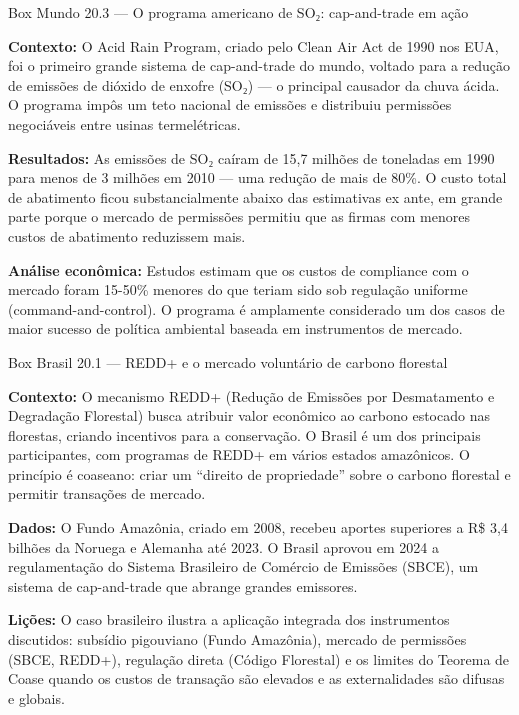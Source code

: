 \documentclass[11pt,twoside,openright]{book}
\begin{document}
\begin{boxmundobox}{Box Mundo 20.3 — O programa americano de SO₂: cap-and-trade em ação}

\textbf{Contexto:} O Acid Rain Program, criado pelo Clean Air Act de
1990 nos EUA, foi o primeiro grande sistema de cap-and-trade do mundo,
voltado para a redução de emissões de dióxido de enxofre (SO₂) --- o
principal causador da chuva ácida. O programa impôs um teto nacional de
emissões e distribuiu permissões negociáveis entre usinas termelétricas.

\textbf{Resultados:} As emissões de SO₂ caíram de 15,7 milhões de
toneladas em 1990 para menos de 3 milhões em 2010 --- uma redução de
mais de 80\%. O custo total de abatimento ficou substancialmente abaixo
das estimativas ex ante, em grande parte porque o mercado de permissões
permitiu que as firmas com menores custos de abatimento reduzissem mais.

\textbf{Análise econômica:} Estudos estimam que os custos de compliance
com o mercado foram 15-50\% menores do que teriam sido sob regulação
uniforme (command-and-control). O programa é amplamente considerado um
dos casos de maior sucesso de política ambiental baseada em instrumentos
de mercado.

\end{boxmundobox}

\begin{boxbrasilbox}{Box Brasil 20.1 — REDD+ e o mercado voluntário de carbono florestal}

\textbf{Contexto:} O mecanismo REDD+ (Redução de Emissões por
Desmatamento e Degradação Florestal) busca atribuir valor econômico ao
carbono estocado nas florestas, criando incentivos para a conservação. O
Brasil é um dos principais participantes, com programas de REDD+ em
vários estados amazônicos. O princípio é coaseano: criar um ``direito de
propriedade'' sobre o carbono florestal e permitir transações de
mercado.

\textbf{Dados:} O Fundo Amazônia, criado em 2008, recebeu aportes
superiores a R\$ 3,4 bilhões da Noruega e Alemanha até 2023. O Brasil
aprovou em 2024 a regulamentação do Sistema Brasileiro de Comércio de
Emissões (SBCE), um sistema de cap-and-trade que abrange grandes
emissores.

\textbf{Lições:} O caso brasileiro ilustra a aplicação integrada dos
instrumentos discutidos: subsídio pigouviano (Fundo Amazônia), mercado
de permissões (SBCE, REDD+), regulação direta (Código Florestal) e os
limites do Teorema de Coase quando os custos de transação são elevados e
as externalidades são difusas e globais.

\end{boxbrasilbox}
\end{document}
